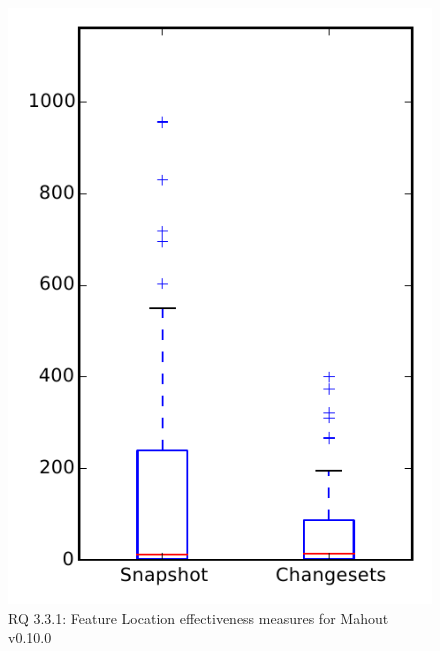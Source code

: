 
\begin{figure}
\centering
\includegraphics[height=0.4\textheight]{figures/flt/rq1_mahout}
\caption{RQ 3.3.1: Feature Location effectiveness measures for Mahout v0.10.0}
\label{fig:flt:rq1:mahout}
\end{figure}
